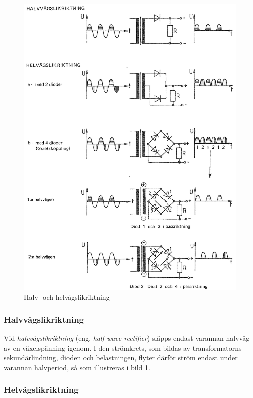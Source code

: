 \begin{figure}
\includegraphics[width=\textwidth]{images/cropped_pdfs/bild_2_3-35.pdf}
\caption{Halv- och helvågslikriktning}
\label{fig:BildII3-35}
\end{figure}

\subsubsection{Halvvågslikriktning}

Vid \emph{halvvågslikriktning} (eng. \emph{half wave rectifier}) släpps endast
varannan halvvåg av en växelspänning igenom.
I den strömkrets, som bildas av transformatorns sekundärlindning, dioden och
belastningen, flyter därför ström endast under varannan halvperiod, så som
illustreras i bild \ref{fig:BildII3-35}.

\subsubsection{Helvågslikriktning}

